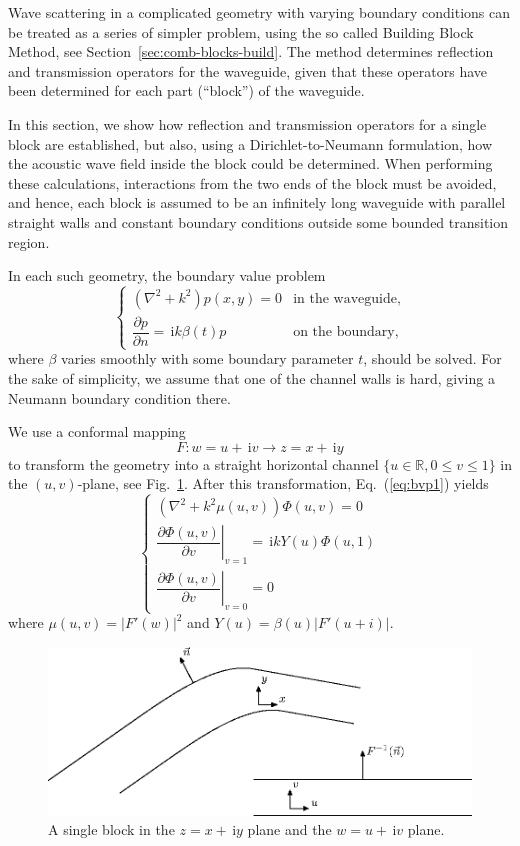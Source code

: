 \documentclass[numreferences]{kluwer}
\providecommand{\abs}[1]{\left\lvert#1\right\rvert}
\renewcommand{\Phi}{\varPhi}
\renewcommand{\i}{\,\mathrm{i}}
\newcommand{\R}{\mathbb R}
\newcommand{\pd}[2]{\dfrac{\partial#1}{\partial#2}}
\renewcommand{\Phi}{\varPhi}
\begin{document}
Wave scattering in a complicated geometry with varying boundary
conditions can be treated as a series of simpler problem, using the so
called Building Block Method, see
Section~\ref{sec:comb-blocks-build}. The method determines reflection
and transmission operators for the waveguide, given that these
operators have been determined for each part (``block'') of the
waveguide. 

In this section, we show how reflection and transmission operators for
a single block are established, but also, using a Dirichlet-to-Neumann
formulation, how the acoustic wave field inside the block could be
determined.  When performing these calculations, interactions from the
two ends of the block must be avoided, and hence, each block is
assumed to be an infinitely long waveguide with parallel straight
walls and constant boundary conditions outside some bounded transition
region.

In each such geometry, the boundary value problem
\begin{equation}
  \label{eq:bvp1}
  \begin{cases}
    \left(\nabla^2+k^2\right)p(x,y)=0&\text{in the waveguide,}\\[1ex]
    \pd pn=\i k\beta(t)p&\text{on the boundary,}
  \end{cases}
\end{equation}
where $\beta$ varies smoothly with some boundary parameter $t$, should
be solved. For the sake of simplicity, we assume that one of the
channel walls is hard, giving a Neumann boundary condition there.

We use a conformal mapping
\begin{equation*}
  F:w=u+\i v\to z=x+\i y
\end{equation*}
to transform the geometry into a straight horizontal channel
\mbox{$\{u\in\R,0\le v\le1\}$} in the $(u,v)$-plane, see
Fig.~\ref{fig:confmap}. After this transformation, Eq.~(\ref{eq:bvp1})
yields
\begin{equation}
  \label{eq:bvp2}
  \begin{cases}
    \left(\nabla^2+k^2\mu(u,v)\right)\Phi(u,v)=0\\[1ex]
    \left.\pd{\Phi(u,v)}v\right|_{v=1}=\i kY(u)\Phi(u,1)\\[1.5ex]
    \left.\pd{\Phi(u,v)}v\right|_{v=0}=0
  \end{cases}
\end{equation}
where $\mu(u,v)=\abs{F'(w)}^2$ and $Y(u)=\beta(u)\abs{F'(u+i)}$.
\begin{figure}[htb]
  \centering
  \includegraphics[scale=1]{waveguide-3}
  \caption{A single block in the $z=x+\i y$ plane and the $w=u+\i v$
    plane.}
  \label{fig:confmap}
\end{figure}
\end{document}
